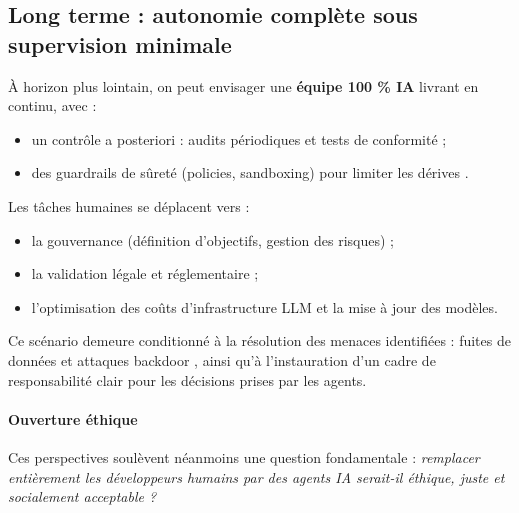 \subsection{Long terme : autonomie complète sous supervision minimale}

À horizon plus lointain, on peut envisager une \textbf{équipe 100 \% IA} livrant en continu, avec :
\begin{itemize}
  \item un contrôle a posteriori : audits périodiques et tests de conformité ;  
  \item des guardrails de sûreté (policies, sandboxing) pour limiter les dérives \parencite{cui_risk_2024}.  
\end{itemize}
Les tâches humaines se déplacent vers :
\begin{itemize}
  \item la gouvernance (définition d’objectifs, gestion des risques) ;  
  \item la validation légale et réglementaire ;  
  \item l’optimisation des coûts d’infrastructure LLM et la mise à jour des modèles.  
\end{itemize}
Ce scénario demeure conditionné à la résolution des menaces identifiées : fuites de données et attaques backdoor \parencite{wang_unique_2024}, ainsi qu’à l’instauration d’un cadre de responsabilité clair pour les décisions prises par les agents.

\paragraph{Ouverture éthique}Ces perspectives soulèvent néanmoins une question fondamentale : \textit{remplacer entièrement les développeurs humains par des agents IA serait-il éthique, juste et socialement acceptable ?}
